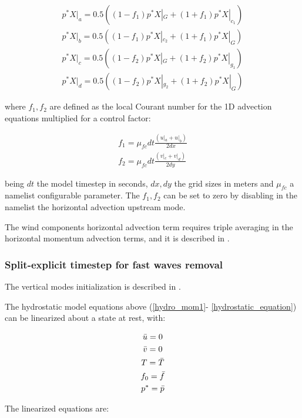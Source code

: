 \begin{eqnarray}
\label{advection_equation_2}
p^*X|_a = 0.5 ( (1-f_1) p^*X|_{G} + (1+f_1) p^*X|_{c_1} ) \\
p^*X|_b = 0.5 ( (1-f_1) p^*X|_{c_2} + (1+f_1) p^*X|_{G} ) \\
p^*X|_c = 0.5 ( (1-f_2) p^*X|_{G} + (1+f_2) p^*X|_{g_1} ) \\
p^*X|_d = 0.5 ( (1-f_2) p^*X|_{g_2} + (1+f_2) p^*X|_{G} )
\end{eqnarray}

where $f_1,f_2$ are defined as the local Courant number for the 1D advection
equations multiplied for a control factor:

\begin{eqnarray}
\label{advection_equation_3}
f_1 = \mu_{fc} dt \frac{(u|_a + u|_b)}{2dx} \\
f_2 = \mu_{fc} dt \frac{(v|_c + v|_d)}{2dy}
\end{eqnarray}

being $dt$ the model timestep in seconds, $dx,dy$ the grid sizes in meters and
$\mu_{fc}$ a namelist configurable parameter. The $f_1,f_2$ can be set
to zero by disabling in the namelist the horizontal advection upstream mode.

The wind components horizontal advection term requires triple averaging in
the horizontal momentum advection terms, and it is described in
\cite{Anthes_72}.

\subsubsection{Split-explicit timestep for fast waves removal}

The vertical modes initialization is  described in \cite{Errico_88}.

The hydrostatic model equations above (\ref{hydro_mom1}-
\ref{hydrostatic_equation}) can be linearized about a state at rest,
with:

\begin{gather}
\label{reference_atm}
  \bar{u} = 0 \nonumber \\
  \bar{v} = 0 \nonumber \\
  T = \bar{T} \nonumber \\
  f_0 = \bar{f} \nonumber \\
  p^{\ast} = \bar{p}
\end{gather}

The linearized equations are:

